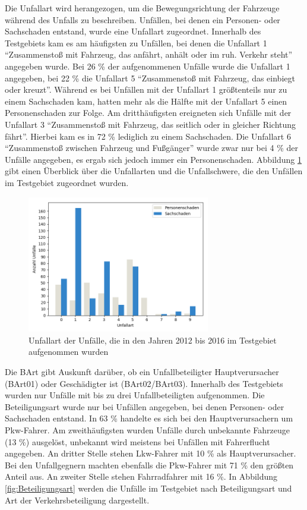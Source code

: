 Die Unfallart wird herangezogen, um die Bewegungsrichtung der Fahrzeuge während des Unfalls zu beschreiben. Unfällen, bei denen ein Personen- oder Sachschaden entstand, wurde eine Unfallart zugeordnet. Innerhalb des Testgebiets kam es am häufigsten zu Unfällen, bei denen die Unfallart 1 \enquote{Zusammenstoß mit Fahrzeug, das anfährt, anhält oder im ruh. Verkehr steht} angegeben wurde. Bei 26 \% der aufgenommenen Unfälle wurde die Unfallart 1 angegeben, bei 22 \% die Unfallart 5 \enquote{Zusammenstoß mit Fahrzeug, das einbiegt oder kreuzt}. Während es bei Unfällen mit der Unfallart 1 größtenteils nur zu einem Sachschaden kam, hatten mehr als die Hälfte mit der Unfallart 5 einen Personenschaden zur Folge. Am dritthäufigsten ereigneten sich Unfälle mit der Unfallart 3 \enquote{Zusammenstoß mit Fahrzeug, das seitlich oder in gleicher Richtung fährt}. Hierbei kam es in 72 \% lediglich zu einem Sachschaden. Die Unfallart 6 \enquote{Zusammenstoß zwischen Fahrzeug und Fußgänger} wurde zwar nur bei 4 \% der Unfälle angegeben, es ergab sich jedoch immer ein Personenschaden. Abbildung \ref{fig:Unfallart} gibt einen Überblick über die Unfallarten und die Unfallschwere, die den Unfällen im Testgebiet zugeordnet wurden.

\begin{savenotes}
	\begin{figure}[H]
		\centering
		\includegraphics[width=8cm,height=6cm]{figures/Unfallart}
		\caption[Unfallart der Unfälle, die in den Jahren 2012 bis 2016 im Testgebiet aufgenommen wurden]{Unfallart der Unfälle, die in den Jahren 2012 bis 2016 im Testgebiet aufgenommen wurden}\label{fig:Unfallart}
	\end{figure}
\end{savenotes}

Die \ac{BArt} gibt Auskunft darüber, ob ein Unfallbeteiligter Hauptverursacher (BArt01) oder Geschädigter ist (BArt02/BArt03). Innerhalb des Testgebiets wurden nur Unfälle mit bis zu drei Unfallbeteiligten aufgenommen. Die Beteiligungsart wurde nur bei Unfällen angegeben, bei denen Personen- oder Sachschaden entstand. In 63 \% handelte es sich bei den Hauptverursachern um Pkw-Fahrer. Am zweithäufigsten wurden Unfälle durch unbekannte Fahrzeuge (13 \%) ausgelöst, unbekannt wird meistens bei Unfällen mit Fahrerflucht angegeben. An dritter Stelle stehen Lkw-Fahrer mit 10 \% als Hauptverursacher. Bei den Unfallgegnern machten ebenfalls die Pkw-Fahrer mit 71 \% den größten Anteil aus. An zweiter Stelle stehen Fahrradfahrer mit 16 \%. In Abbildung \ref{fig:Beteiligungsart} werden die Unfälle im Testgebiet nach Beteiligungsart und Art der Verkehrsbeteiligung dargestellt. 

